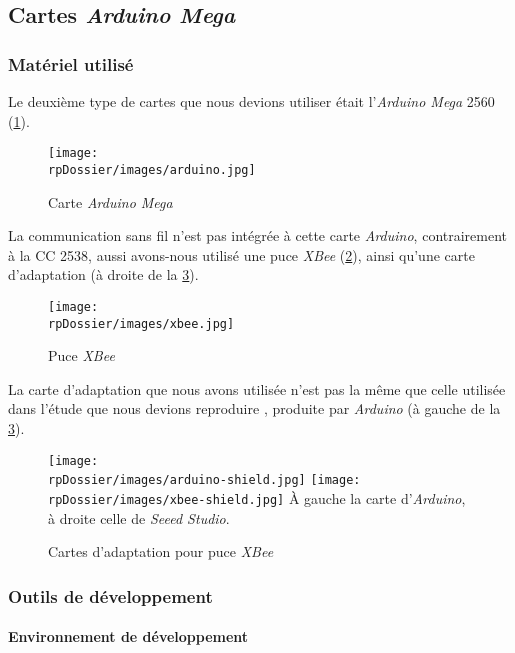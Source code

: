 \subsection{Cartes \emph{Arduino Mega}}

\subsubsection{Matériel utilisé}

\noindent Le deuxième type de cartes que nous devions utiliser était l’\emph{Arduino Mega} 2560 (\cref{arduino}).

\begin{figure}[H]
\centering
\texttt{[image: \\rpDossier/images/arduino.jpg]}
\caption{Carte \emph{Arduino Mega}}
\label{arduino}
\end{figure}

La communication sans fil n’est pas intégrée à cette carte \emph{Arduino}, contrairement à la CC 2538, aussi avons-nous utilisé une puce \emph{XBee} (\cref{xbee}), ainsi qu’une carte d’adaptation (à droite de la \cref{xbee-shields}).

\begin{figure}[H]
\centering
\texttt{[image: \\rpDossier/images/xbee.jpg]}
\caption{Puce \emph{XBee}}
\label{xbee}
\end{figure}

La carte d’adaptation que nous avons utilisée n’est pas la même que celle utilisée dans l’étude que nous devions reproduire \cite{eymery}, produite par \emph{Arduino} (à gauche de la \cref{xbee-shields}).

\begin{figure}[H]
\centering
\texttt{[image: \\rpDossier/images/arduino-shield.jpg]}
\texttt{[image: \\rpDossier/images/xbee-shield.jpg]}
\newline
À gauche la carte d’\emph{Arduino}, à droite celle de \emph{Seeed Studio}.
\caption{Cartes d’adaptation pour puce \emph{XBee}}
\label{xbee-shields}
\end{figure}

\subsubsection{Outils de développement}

\paragraph{Environnement de développement}


